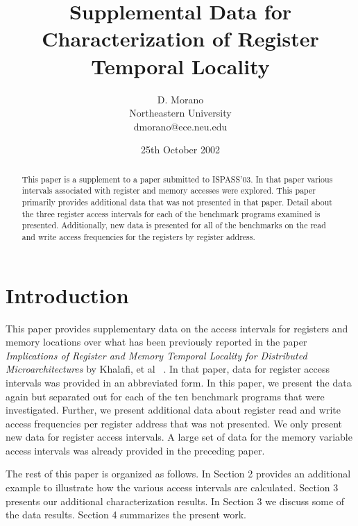 \documentclass[10pt,dvips]{article}
\begin{document}
%
%
%
\title{Supplemental Data for Characterization of Register
Temporal Locality}
%
%
\author{
D. Morano\\
Northeastern University\\
dmorano@ece.neu.edu\\
}
%
%
\date{25th October 2002}
%
\maketitle
%
%
%
\begin{abstract}
%
This paper is a supplement to a paper submitted to ISPASS'03.
In that paper
various intervals associated with register and memory accesses
were explored.
This paper primarily provides additional data that was not
presented in that paper.
Detail about the three register access intervals for each of
the benchmark programs examined is presented.
Additionally, new data is presented for all of the benchmarks
on the read and write access frequencies for the registers 
by register address.
%
\end{abstract}
%
%
\section{Introduction}
%
This paper provides supplementary data on the access intervals
for registers and memory locations over what has been previously
reported in the paper \textit{Implications of Register and 
Memory Temporal Locality for
Distributed Microarchitectures} by Khalafi, et al ~\cite{khalafi_ispass03}.
In that paper, data for register access intervals was provided
in an abbreviated form.  In this paper, we present the data
again but separated out for each of the ten benchmark programs
that were investigated.  Further, we present additional data
about register read and write access frequencies per register
address that was not presented.
We only present new data for register access intervals.
A large set of data for the memory variable access intervals
was already provided in the preceding paper.

The rest of this paper is organized as follows.
In Section 2 provides an additional example to illustrate
how the various access intervals are calculated.
Section 3 presents our additional characterization results.
In Section 3 we discuss some of the data results.
Section 4 summarizes the present work.
%
%
%
\end{document}
